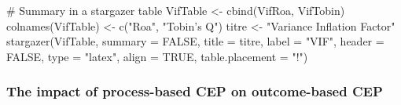 \documentclass[12pt,]{article}
\newenvironment{Shaded}{}{}
\newcommand{\KeywordTok}[1]{\textcolor[rgb]{0.00,0.00,1.00}{#1}}
\newcommand{\DataTypeTok}[1]{#1}
\newcommand{\StringTok}[1]{\textcolor[rgb]{0.00,0.50,0.50}{#1}}
\newcommand{\CommentTok}[1]{\textcolor[rgb]{0.00,0.50,0.00}{#1}}
\newcommand{\OtherTok}[1]{\textcolor[rgb]{1.00,0.25,0.00}{#1}}
\newcommand{\NormalTok}[1]{#1}
\begin{document}
\begin{Shaded}
\begin{Highlighting}[]
\CommentTok{# Summary in a stargazer table}
\NormalTok{VifTable <-}\StringTok{ }\KeywordTok{cbind}\NormalTok{(VifRoa, VifTobin)}
\KeywordTok{colnames}\NormalTok{(VifTable) <-}\StringTok{ }\KeywordTok{c}\NormalTok{(}\StringTok{"Roa"}\NormalTok{, }\StringTok{"Tobin's Q"}\NormalTok{)}
\NormalTok{titre <-}\StringTok{ "Variance Inflation Factor"}
\KeywordTok{stargazer}\NormalTok{(VifTable, }\DataTypeTok{summary =} \OtherTok{FALSE}\NormalTok{, }\DataTypeTok{title =}\NormalTok{ titre, }\DataTypeTok{label =} \StringTok{"VIF"}\NormalTok{, }
    \DataTypeTok{header =} \OtherTok{FALSE}\NormalTok{, }\DataTypeTok{type =} \StringTok{"latex"}\NormalTok{, }\DataTypeTok{align =} \OtherTok{TRUE}\NormalTok{, }\DataTypeTok{table.placement =} \StringTok{"!"}\NormalTok{)}
\end{Highlighting}
\end{Shaded}

\hypertarget{the-impact-of-process-based-cep-on-outcome-based-cep-1}{\subsubsection*{The
impact of process-based CEP on outcome-based
CEP}\label{the-impact-of-process-based-cep-on-outcome-based-cep-1}}
\end{document}
